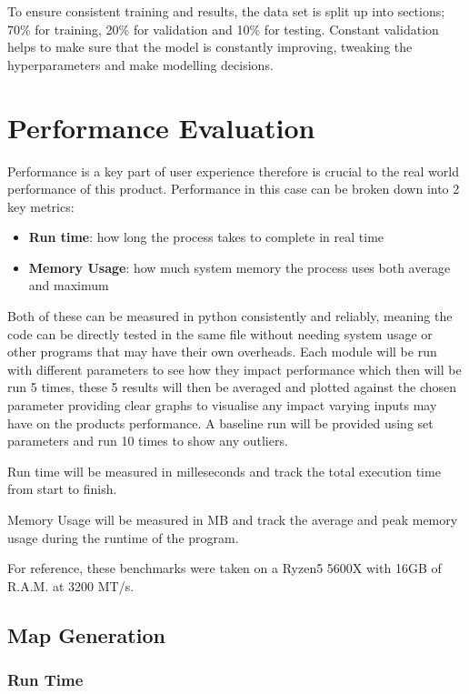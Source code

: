 \documentclass[final]{cmpreport_02}
\begin{document}
To ensure consistent training and results, the data set is split up into sections; 70\% for training, 20\% for validation and 10\% for testing.
Constant validation helps to make sure that the model is constantly improving, tweaking the hyperparameters and make modelling decisions.
\section{Performance Evaluation}
Performance is a key part of user experience therefore is crucial to the real world performance of this product.
Performance in this case can be broken down into 2 key metrics:

\begin{itemize}
    \item{\textbf{Run time}: how long the process takes to complete in real time}
    \item{\textbf{Memory Usage}: how much system memory the process uses both average and maximum}
\end{itemize}

Both of these can be measured in python consistently and reliably, meaning the code can be directly tested in the same file without needing system usage or other programs that may have their own overheads.
Each module will be run with different parameters to see how they impact performance which then will be run 5 times,
these 5 results will then be averaged and plotted against the chosen parameter providing clear graphs to visualise any impact varying inputs may have on the products performance.
A baseline run will be provided using set parameters and run 10 times to show any outliers.

Run time will be measured in milleseconds and track the total execution time from start to finish.

Memory Usage will be measured in MB and track the average and peak memory usage during the runtime of the program.

For reference, these benchmarks were taken on a Ryzen5 5600X with 16GB of R.A.M. at 3200 MT/s.

\subsection{Map Generation}
\subsubsection{Run Time}
\end{document}
